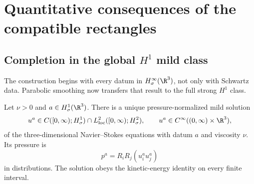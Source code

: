 \section{Quantitative consequences of the compatible rectangles}
\label{sec:quantitative-consequences}

\subsection[Completion in the global H1 mild class]
{Completion in the global \(H^1\) mild class}

The construction begins with every datum in
\(H^\infty_\sigma(\R^3)\), not only with Schwartz data.  Parabolic smoothing
now transfers that result to the full strong \(H^1\) class.

\begin{theorem}
\label{thm:qc-global-H1-completion}
Let \(\nu>0\) and \(a\in H^1_\sigma(\R^3)\).  There is a unique
pressure-normalized mild solution
\begin{equation}
 u^a\in C([0,\infty);H^1_\sigma)
 \cap L^2_{\rm loc}([0,\infty);H^2_\sigma),
 \qquad
 u^a\in C^\infty((0,\infty)\times\R^3),
 \label{eq:qc-global-H1-class}
\end{equation}
of the three-dimensional Navier--Stokes equations with datum \(a\) and
viscosity \(\nu\).  Its pressure is
\[
 p^a=R_iR_j(u_i^a u_j^a)
\]
in distributions.  The solution obeys the kinetic-energy identity on every
finite interval.
\end{theorem}

